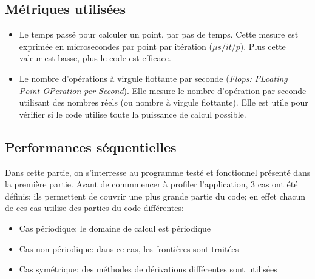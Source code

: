 
\subsection{Métriques utilisées}
\begin{itemize}
\item Le temps passé pour calculer un point, par pas de temps. Cette mesure est exprimée en microsecondes par point par itération ($\mu s/it/p$). Plus cette valeur est basse, plus le code est efficace. 

\item Le nombre d'opérations à virgule flottante par seconde (\textit{Flops: FLoating Point OPeration per Second}). Elle mesure le nombre d'opération par seconde utilisant des nombres réels (ou nombre à virgule flottante). Elle est utile pour vérifier si le code utilise toute la puissance de calcul possible.
\end{itemize}




\subsection{Performances séquentielles}
Dans cette partie, on s'interresse au programme testé et fonctionnel présenté dans la première partie. Avant de commmencer à profiler l'application, 3 cas ont été définis; ils permettent de couvrir une plus grande partie du code; en effet chacun de ces cas utilise des parties du code différentes:
\begin{itemize}
\item Cas périodique: le domaine de calcul est périodique
\item Cas non-périodique: dans ce cas, les frontières sont traitées
\item Cas symétrique: des méthodes de dérivations différentes sont utilisées
\end{itemize}


